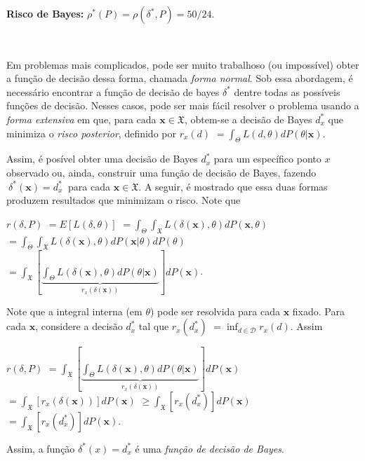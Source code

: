 \documentclass[
]{book}
\begin{document}
\textbf{Risco de Bayes:} \(\rho^*(P)=\rho({\delta}^*,P)=50/24\).

\(~\)

Em problemas mais complicados, pode ser muito trabalhoso (ou impossível) obter a função de decisão dessa forma, chamada \emph{forma normal}. Sob essa abordagem, é necessário encontrar a função de decisão de bayes \({\delta}^*\) dentre todas as possíveis funções de decisão. Nesses casos, pode ser mais fácil resolver o problema usando a \emph{forma extensiva} em que, para cada \(\boldsymbol x \in \mathfrak{X}\), obtem-se a decisão de Bayes \({d}_{x}^*\) que minimiza o \emph{risco posterior}, definido por \(r_x(d)\) \(= \displaystyle \int_\Theta L(d,\theta) dP(\theta|\boldsymbol x)\).

Assim, é posível obter uma decisão de Bayes \({d}_x^*\) para um específico ponto \(x\) observado ou, ainda, construir uma função de decisão de Bayes, fazendo \(~{\delta}^*(\boldsymbol x) = {d}_x^*~\) para cada \(\boldsymbol x \in \mathfrak{X}\). A seguir, é mostrado que essa duas formas produzem resultados que minimizam o risco. Note que

\(r(\delta,P)\) \(=E\left[L\left(\delta,\theta\right)\right]\) \(=\displaystyle \int_\Theta \int_{\mathfrak{X}} L\left(\delta(\boldsymbol x),\theta\right) dP(\boldsymbol x,\theta)\) \(=\displaystyle \int_\Theta \int_{\mathfrak{X}} L\left(\delta(\boldsymbol x),\theta\right) dP(\boldsymbol x|\theta)dP(\theta)\) \(=\displaystyle \int_{\mathfrak{X}} \left[ \underbrace{\int_\Theta L\left(\delta(\boldsymbol x),\theta\right) dP(\theta|\boldsymbol x)}_{r_x\left(\delta(\boldsymbol x)\right)} \right]dP(\boldsymbol x)\).

Note que a integral interna (em \(\theta\)) pode ser resolvida para cada \(\boldsymbol x\) fixado. Para cada \(\boldsymbol x\), considere a decisão \({d}_x^*\) tal que \(r_x\left({d}_x^*\right)\) \(=\displaystyle \inf_{d \in \mathcal{D}} r_x(d)\). Assim

\(r(\delta,P)\) \(=\displaystyle \int_{\mathfrak{X}} \left[ \underbrace{\int_\Theta L\left(\delta(\boldsymbol x),\theta\right) dP(\theta|\boldsymbol x)}_{r_x\left(\delta(\boldsymbol x)\right)} \right]dP(\boldsymbol x)\) \(=\displaystyle \int_{\mathfrak{X}} \left[ {r_x\left(\delta(\boldsymbol x)\right)} \right]dP(\boldsymbol x)\) \(\geq \displaystyle \int_{\mathfrak{X}} \left[ {r_x\left({d}_x^*\right)} \right]dP(\boldsymbol x)\) \(= \displaystyle \int_{\mathfrak{X}} \left[ {r_x\left({d}_x^*\right)} \right]dP(\boldsymbol x)\).

Assim, a função \({\delta}^*(x)={d}^*_{x}\) é uma \emph{função de decisão de Bayes}.
\end{document}
